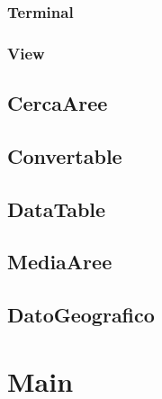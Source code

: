 \documentclass[a4paper, 12pt]{report}
\begin{document}
				\subsubsection{Terminal}
				\subsubsection{View}

			\subsection{CercaAree}
			\subsection{Convertable}
			\subsection{DataTable}
			\subsection{MediaAree}
			\subsection{DatoGeografico}

		\section{Main}

	
\end{document}
